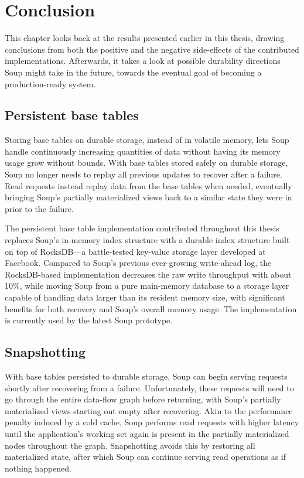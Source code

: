 \chapter{Conclusion}\label{chap:conclusion}

This chapter looks back at the results presented earlier in this thesis, drawing
conclusions from both the positive and the negative side-effects of the
contributed implementations. Afterwards, it takes a look at possible durability
directions Soup might take in the future, towards the eventual goal of becoming
a production-ready system.

\newpage

\section{Persistent base tables}

Storing base tables on durable storage, instead of in volatile memory, lets Soup
handle continuously increasing quantities of data without having its memory
usage grow without bounds. With base tables stored safely on durable storage,
Soup no longer needs to replay all previous updates to recover after a failure.
Read requests instead replay data from the base tables when needed, eventually
bringing Soup's partially materialized views back to a similar state they were
in prior to the failure.

The persistent base table implementation contributed throughout this thesis
replaces Soup's in-memory index structure with a durable index structure built
on top of RocksDB---a battle-tested key-value storage layer developed at
Facebook. Compared to Soup's previous ever-growing write-ahead log, the
RocksDB-based implementation decreases the raw write throughput with about 10\%,
while moving Soup from a pure main-memory database to a storage layer capable of
handling data larger than its resident memory size, with significant benefits
for both recovery and Soup's overall memory usage. The implementation is
currently used by the latest Soup prototype.

\section{Snapshotting}

With base tables persisted to durable storage, Soup can begin serving requests
shortly after recovering from a failure. Unfortunately, these requests will need
to go through the entire data-flow graph before returning, with Soup's partially
materialized views starting out empty after recovering. Akin to the performance
penalty induced by a cold cache, Soup performs read requests with higher latency
until the application's working set again is present in the partially
materialized nodes throughout the graph. Snapshotting avoids this by restoring
all materialized state, after which Soup can continue serving read operations as
if nothing happened.

